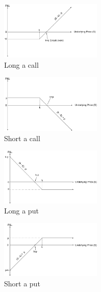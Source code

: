 \documentclass[12pt, a4paper, notitlepage]{article}
\numberwithin{equation}{subsection}
\numberwithin{figure}{subsection}
\numberwithin{table}{subsection}
\begin{document}
\begin{multicols}{2}
  \begin{figure}[H]
      \caption{Long a call}
      \centerline{\includegraphics[width=0.43\textwidth]{Long_Call_Position}}
      \label{fig:LongACall}
  \end{figure}
  \begin{figure}[H]
      \caption{Short a call}
      \centerline{\includegraphics[width=0.43\textwidth]{Short_Call_Position}}
      \label{fig:ShortACall}
  \end{figure}
\end{multicols}

\begin{multicols}{2}
  \begin{figure}[H]
    \caption{Long a put}
    \centerline{\includegraphics[width=0.43\textwidth]{Long_Put_Position}}
    \label{fig:LongAPut}
  \end{figure}
  \begin{figure}[H]
    \caption{Short a put}
    \centerline{\includegraphics[width=0.43\textwidth]{Short_Put_Position}}
    \label{fig:ShortAPut}
  \end{figure}
\end{multicols}
\end{document}
